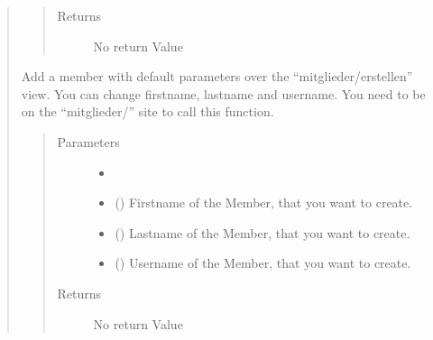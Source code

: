 \documentclass[letterpaper,10pt,english]{sphinxmanual}
\begin{document}
\begin{quote}
\begin{fulllineitems}
\begin{quote}
\begin{description}
\item[{Returns}] \leavevmode
No return Value

\end{description}\end{quote}

\end{fulllineitems}



\begin{fulllineitems}
Add a member with default parameters over the “mitglieder/erstellen” view.
You can change firstname, lastname and username.
You need to be on the “mitglieder/” site to call this function.
\begin{quote}\begin{description}
\item[{Parameters}] \leavevmode\begin{itemize}
\item {} 
 \textendash{} 

\item {} 
 () \textendash{} Firstname of the Member, that you want to create.

\item {} 
 () \textendash{} Lastname of the Member, that you want to create.

\item {} 
 () \textendash{} Username of the Member, that you want to create.

\end{itemize}

\item[{Returns}] \leavevmode
No return Value

\end{description}\end{quote}

\end{fulllineitems}




\end{quote}
\end{document}
